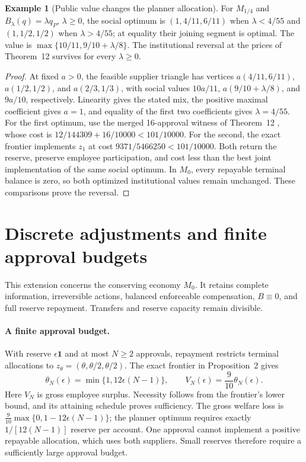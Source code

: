 \documentclass[ecta,draft,supplement]{econsocart}
\theoremstyle{definition}
\theoremstyle{definition}
\newtheorem{example}[theorem]{Example}
\begin{document}
\begin{appendix}
\begin{example}[Public value changes the planner allocation]
\label{ex:valuedproductive}
For $M_{1/4}$ and $B_\lambda(q)=\lambda q_P$, $\lambda\geq0$, the
social optimum is $(1,4/11,6/11)$ when $\lambda<4/55$ and
$(1,1/2,1/2)$ when $\lambda>4/55$; at equality their joining segment
is optimal. The value is $\max\{10/11,9/10+\lambda/8\}$. The
institutional reversal at the prices of
Theorem~12%
 survives for every $\lambda\geq0$.
\end{example}
\begin{proof}
At fixed $a>0$, the feasible supplier triangle has vertices
$a(4/11,6/11)$, $a(1/2,1/2)$, and $a(2/3,1/3)$, with social values
$10a/11$, $a(9/10+\lambda/8)$, and $9a/10$, respectively.
Linearity gives the stated mix, the positive maximal coefficient gives
$a=1$, and equality of the first two coefficients gives $\lambda=4/55$.
For the first optimum, use the merged 16-approval witness of
Theorem~12%
, whose cost is
$12/144309+16/10000<101/10000$. For the second, the exact frontier
implements $z_1$ at cost $9371/5466250<101/10000$. Both return the
reserve, preserve employee participation, and cost less than the best
joint implementation of the same social optimum. In $M_0$, every
repayable terminal balance is zero, so both optimized institutional
values remain unchanged. These comparisons prove the reversal.
\end{proof}


\section{Discrete adjustments and finite approval budgets}
\label{app:indivisibility}

This extension concerns the conserving economy $M_0$. It retains
complete information, irreversible actions, balanced enforceable
compensation, $B\equiv0$, and full reserve repayment. Transfers and
reserve capacity remain divisible.

\paragraph{A finite approval budget.}
With reserve $\epsilon\mathbf1$ and at most $N\geq2$ approvals,
repayment restricts terminal allocations to
$z_\theta=(\theta,\theta/2,\theta/2)$. The exact frontier in
Proposition~2%
 gives
\[
 \theta_N(\epsilon)=\min\{1,12\epsilon(N-1)\},\qquad
 V_N(\epsilon)=\frac9{10}\theta_N(\epsilon).
\]
Here $V_N$ is gross employee surplus. Necessity follows from the
frontier's lower bound, and its attaining schedule proves sufficiency.
The gross welfare loss is
$\frac9{10}\max\{0,1-12\epsilon(N-1)\}$; the planner optimum
requires exactly $1/[12(N-1)]$ reserve per account. One approval
cannot implement a positive repayable allocation, which uses both
suppliers. Small reserves therefore require a sufficiently large
approval budget.


\end{appendix}
\end{document}
